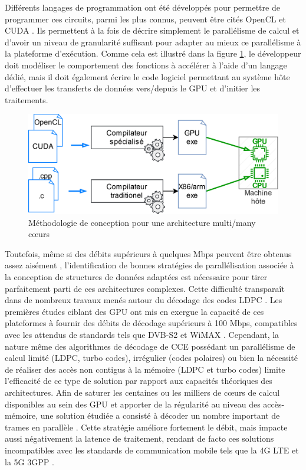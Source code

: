 \documentclass[../main.tex]{subfiles}
\begin{document}
Différents langages de programmation ont été développés pour permettre de programmer ces circuits, parmi les plus connus, peuvent être cités OpenCL \cite{OpenCL} et CUDA \cite{CUDA}. Ils permettent à la fois de décrire simplement le parallélisme de calcul et d’avoir un niveau de granularité suffisant pour adapter au mieux ce parallélisme à la plateforme d’exécution. Comme cela est illustré dans la figure \ref{methodo_multimany}, le développeur doit modéliser le comportement des fonctions à accélérer à l’aide d’un langage dédié, mais il doit également écrire le code logiciel permettant au système hôte d’effectuer les transferts de données vers/depuis le GPU et d’initier les traitements.
\begin{figure}[tb]
    \centering
    \includegraphics[scale=.17]{figs/methodo_multimany.png}
    \caption{Méthodologie de conception pour une architecture multi/many cœurs}
    \label{methodo_multimany}
\end{figure}
Toutefois, même si des débits supérieurs à quelques Mbps peuvent être obtenus assez aisément \cite{Wang13,Wang11,Falcao11}, l’identification de bonnes stratégies de parallélisation associée à la conception de structures de données adaptées est nécessaire pour tirer parfaitement parti de ces architectures complexes. Cette difficulté transparaît dans de nombreux travaux menés autour du décodage des codes LDPC \cite{FALCAO:SURVEY,LDPC:SOFT4}. Les premières études ciblant des GPU \cite{Falcao11} ont mis en exergue la capacité de ces plateformes à fournir des débits de décodage supérieurs à 100 Mbps, compatibles avec les attendus de standards tels que DVB-S2 \cite{DVB:S2} et WiMAX \cite{wimax}. 
Cependant, la nature même des algorithmes de décodage de CCE possédant un parallélisme de calcul limité (LDPC, turbo codes), irrégulier (codes polaires) ou bien la nécessité de réaliser des accès non contigus à la mémoire (LDPC et turbo codes) limite l’efficacité de ce type de solution par rapport aux capacités théoriques des architectures.
Afin de saturer les centaines ou les milliers de cœurs de calcul disponibles au sein des GPU et apporter de la régularité au niveau des accès-mémoire, une solution étudiée a consisté à décoder un nombre important de trames en parallèle \cite{BLG:GPU}. Cette stratégie améliore fortement le débit, mais impacte aussi négativement la latence de traitement, rendant de facto ces solutions incompatibles avec les standards de communication mobile tels que la 4G LTE \cite{Ref_4G} et la 5G 3GPP \cite{5g}.
\end{document}
